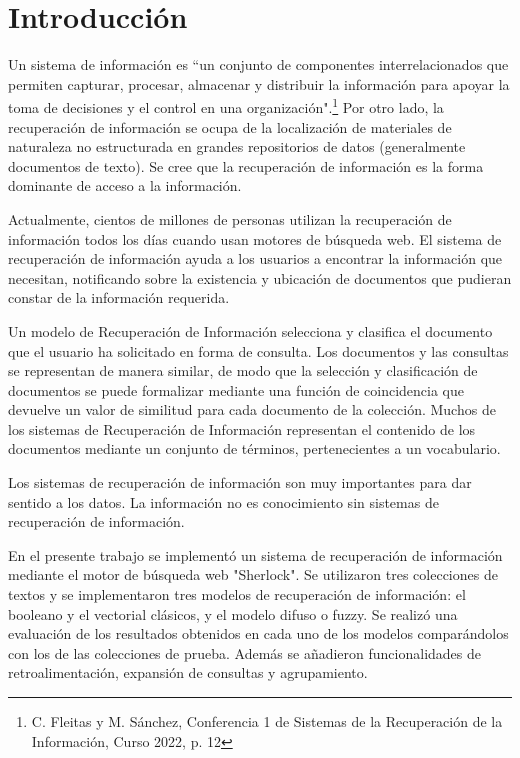 \documentclass{llncs}
\begin{document}
	\newpage
	\tableofcontents
	\thispagestyle{empty}
	
	\newpage
	
	\section{Introducci\'on}
	
	Un sistema de informaci\'on es ``un conjunto de componentes interrelacionados que permiten capturar, procesar, almacenar y distribuir la informaci\'on para apoyar la toma de decisiones y el control en una organizaci\'on".\footnote{C. Fleitas y M. S\'anchez, Conferencia 1 de Sistemas de la Recuperaci\'on de la Informaci\'on, Curso 2022, p. 12} 
	Por otro lado, la recuperación de información se ocupa de la localizaci\'on  de materiales de naturaleza no estructurada en grandes repositorios de datos (generalmente documentos de texto).
	Se cree que la recuperación de información es la forma dominante de acceso a la información. 
	
	Actualmente, cientos de millones de personas utilizan la recuperaci\'on de informaci\'on todos los días cuando usan motores de búsqueda web. El sistema de recuperaci\'on de informaci\'on ayuda a los usuarios a encontrar la información que necesitan, notificando sobre la existencia y ubicación de documentos que pudieran constar de la información requerida.
	
	Un modelo de Recuperación de Información selecciona y clasifica el documento que el usuario ha solicitado en forma de consulta. Los documentos y las consultas se representan de manera similar, de modo que la selección y clasificación de documentos se puede formalizar mediante una función de coincidencia que devuelve un valor de similitud para cada documento de la colección. Muchos de los sistemas de Recuperación de Información representan el contenido de los documentos mediante un conjunto de términos, pertenecientes a un vocabulario.
	
	Los sistemas de recuperación de información son muy importantes para dar sentido a los datos. La información no es conocimiento sin sistemas de recuperación de información.
	
	En el presente trabajo se implement\'o un sistema de recuperaci\'on de informaci\'on mediante el motor de b\'usqueda web "Sherlock". Se utilizaron tres colecciones de textos y se implementaron tres modelos de recuperaci\'on  de informaci\'on: el booleano y el vectorial cl\'asicos, y el modelo difuso o fuzzy. Se realiz\'o una evaluaci\'on de los resultados obtenidos en cada uno de los modelos compar\'andolos con los de las colecciones de prueba. Adem\'as se a\~nadieron funcionalidades de retroalimentaci\'on, expansi\'on de consultas y agrupamiento. 
	
\end{document}
